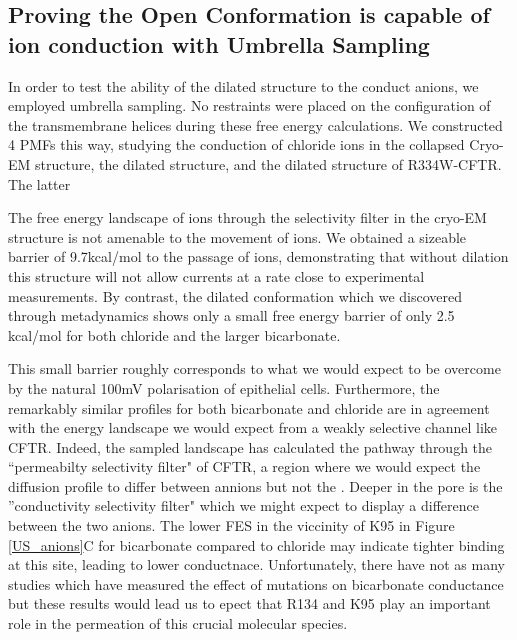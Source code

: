 \subsection{Proving the Open Conformation is capable of ion conduction with Umbrella Sampling}

In order to test the ability of the dilated structure to the conduct anions, we employed umbrella sampling. No restraints were placed on the configuration of the transmembrane helices during these free energy calculations. We constructed 4 PMFs this way, studying the conduction of chloride ions in the collapsed Cryo-EM structure, the dilated structure, and the dilated structure of R334W-CFTR. The latter 

The free energy landscape of ions through the selectivity filter in the cryo-EM structure is not amenable to the movement of ions. We obtained a sizeable barrier of 9.7kcal/mol to the passage of ions, demonstrating that without dilation this structure will not allow currents at a rate close to experimental measurements. By contrast, the dilated conformation which we discovered through metadynamics shows only a small free energy barrier of only 2.5 kcal/mol for both chloride and the larger bicarbonate. 

This small barrier roughly corresponds to what we would expect to be overcome by the natural 100mV polarisation of epithelial cells. Furthermore, the remarkably similar profiles for both bicarbonate and chloride are in agreement with the energy landscape we would expect from a weakly selective channel like CFTR. Indeed, the sampled landscape has calculated the pathway through the ``permeabilty selectivity filter" of CFTR, a region where we would expect the diffusion profile to differ between annions but not the . Deeper in the pore is the ''conductivity selectivity filter" which we might expect to display a difference between the two anions. The lower FES in the viccinity of K95 in Figure \ref{US_anions}C for bicarbonate compared to chloride may indicate tighter binding at this site, leading to lower conductnace. Unfortunately, there have not as many studies which have measured the effect of mutations on bicarbonate conductance but these results would lead us to epect that R134 and K95 play an important role in the permeation of this crucial molecular species. 

